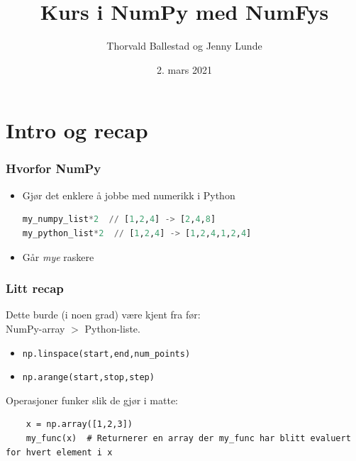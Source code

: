 \documentclass{beamer}
\title{Kurs i NumPy med NumFys}
\author{Thorvald Ballestad og Jenny Lunde}
\date{2. mars 2021}
\begin{document}
\frame{\titlepage}

\frame{\tableofcontents}
\section{Intro og recap}

\begin{frame}[containsverbatim]
	\frametitle{Hvorfor NumPy}
	\begin{itemize}
		\item Gjør det enklere å jobbe med numerikk i Python
			\begin{lstlisting}[language=python]
my_numpy_list*2  // [1,2,4] -> [2,4,8]
my_python_list*2  // [1,2,4] -> [1,2,4,1,2,4]
			\end{lstlisting}
		\item Går \emph{mye} raskere
	\end{itemize}
\end{frame}

\begin{frame}[fragile]
  \frametitle{Litt recap}
  Dette burde (i noen grad) være kjent fra før:\\

  NumPy-array $>$ Python-liste.
  \begin{itemize}
  \item \lstinline{np.linspace(start,end,num_points)}
  \item \lstinline{np.arange(start,stop,step)}
  \end{itemize}

  Operasjoner funker slik de gjør i matte:
  \begin{lstlisting}
    x = np.array([1,2,3])
    my_func(x)  # Returnerer en array der my_func har blitt evaluert for hvert element i x
  \end{lstlisting}
\end{frame}
\end{document}

